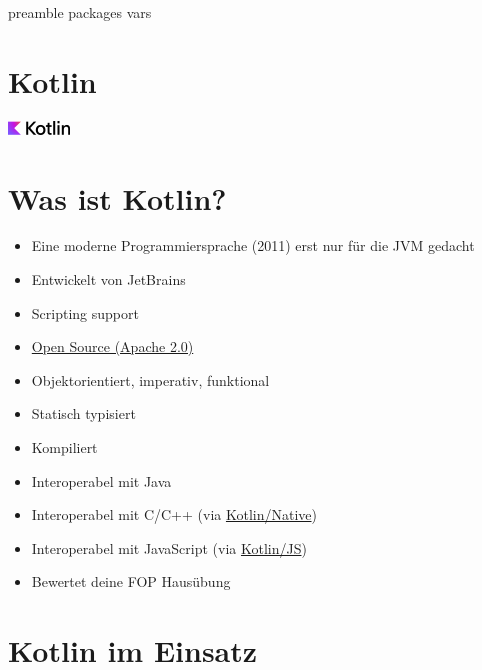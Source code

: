 \RequirePackage{import}
{preamble}
{packages}
{vars}


    \section{Kotlin}\label{sec:kotlin}
    \begin{frame}[c]
        \centering
        \Large
        \includegraphics[scale=3]{../pictures/Kotlin-logo-2021_svg-tex.pdf}
        \linebreak
    \end{frame}


    \section{Was ist Kotlin?}\label{sec:was-ist-kotlin?}
    \begin{frame}
        \slidehead
        \begin{itemize}[<+->]
            \item Eine moderne Programmiersprache (2011) erst nur für die JVM gedacht
            \item Entwickelt von JetBrains
            \item Scripting support
            \item \href{https://github.com/JetBrains/kotlin}{Open Source (Apache 2.0)}
            \item Objektorientiert, imperativ, funktional
            \item Statisch typisiert
            \item Kompiliert
            \item Interoperabel mit Java
            \item Interoperabel mit C/C++ (via \href{https://kotlinlang.org/docs/native-overview.html}{Kotlin/Native})
            \item Interoperabel mit JavaScript (via \href{https://kotlinlang.org/docs/js-overview.html}{Kotlin/JS})
            \item Bewertet deine FOP Hausübung
        \end{itemize}
    \end{frame}


    \section{Kotlin im Einsatz}\label{sec:kotlin-im-einsatz}

